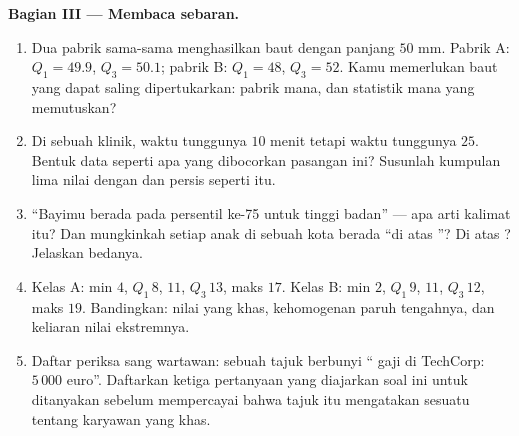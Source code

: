 \begin{problem}
\medskip
\noindent\textbf{Bagian III --- Membaca sebaran.}
\begin{enumerate}[resume]
  \item Dua pabrik sama-sama menghasilkan baut dengan  panjang
        $50$ mm. Pabrik A: $Q_1 = 49.9$, $Q_3 = 50.1$; pabrik
        B: $Q_1 = 48$, $Q_3 = 52$. Kamu memerlukan baut yang dapat saling
        dipertukarkan: pabrik mana, dan statistik mana yang memutuskan?
  \item Di sebuah klinik,  waktu tunggunya $10$ menit tetapi
         waktu tunggunya $25$. Bentuk data seperti apa yang
        dibocorkan pasangan ini? Susunlah kumpulan lima nilai dengan 
        dan  persis seperti itu.
  \item ``Bayimu berada pada persentil ke-75 untuk tinggi badan'' ---
        apa arti kalimat itu? Dan mungkinkah setiap anak di sebuah kota
        berada ``di atas ''? Di atas ? Jelaskan
        bedanya.
  \item Kelas A: min $4$, $Q_1\,8$,  $11$, $Q_3\,13$, maks
        $17$. Kelas B: min $2$, $Q_1\,9$,  $11$, $Q_3\,12$,
        maks $19$. Bandingkan: nilai yang khas, kehomogenan
        paruh tengahnya, dan keliaran nilai ekstremnya.
  \item Daftar periksa sang wartawan: sebuah tajuk berbunyi ``
        gaji di TechCorp: $5\,000$ euro''. Daftarkan ketiga
        pertanyaan yang diajarkan soal ini untuk ditanyakan sebelum
        mempercayai bahwa tajuk itu mengatakan sesuatu tentang karyawan
        yang khas.
\end{enumerate}


\end{problem}
